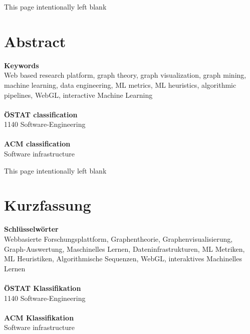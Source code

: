 {\clearpage
\begin{center}
This page intentionally left blank
\end{center}
\clearpage

\section*{Abstract}




\vfill
\noindent
\textbf{Keywords}\\
Web based research platform, graph theory, graph visualization, graph mining, machine learning, data engineering, ML metrics, ML heuristics, algorithmic pipelines, WebGL, interactive Machine Learning \\
\\
\textbf{ÖSTAT classification}\\
1140 Software-Engineering\\
\\
\textbf{ACM classification}\\
Software infrastructure

\clearpage
\begin{center}
This page intentionally left blank
\end{center}
\clearpage



\section*{Kurzfassung}



\vfill
\noindent
\textbf{Schlüsselwörter}\\
Webbasierte Forschungsplattform, Graphentheorie, Graphenvisualisierung, Graph-Auswertung, Maschinelles Lernen, Dateninfrastrukturen, ML Metriken, ML Heuristiken, Algorithmische Sequenzen, WebGL, interaktives Machinelles Lernen\\
\\
\textbf{ÖSTAT Klassifikation}\\
1140 Software-Engineering\\
\\
\textbf{ACM Klassifikation}\\
Software infrastructure

}
